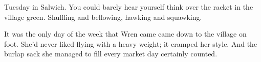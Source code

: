 
Tuesday in Salwich.
You could barely hear yourself think over the racket in the village green.
Shuffling and bellowing, hawking and squawking.

It was the only day of the week that Wren came came down to the village on foot.
She'd never liked flying with a heavy weight; it cramped her style.
And the burlap sack she managed to fill every market day certainly counted.
